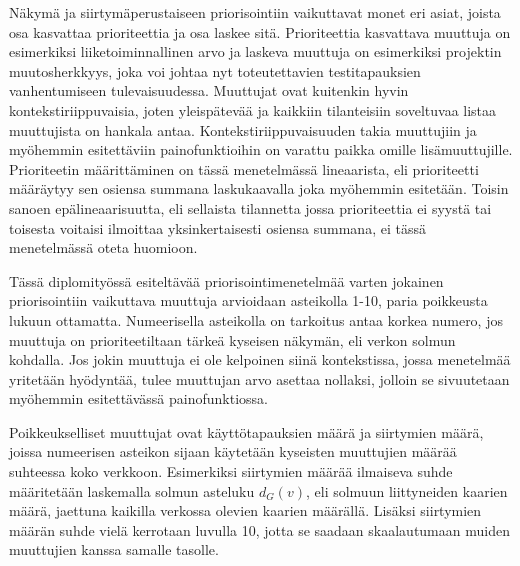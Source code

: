   Näkymä ja siirtymäperustaiseen priorisointiin vaikuttavat monet eri asiat, joista osa kasvattaa prioriteettia ja osa laskee sitä.
  Prioriteettia kasvattava muuttuja on esimerkiksi liiketoiminnallinen arvo ja laskeva muuttuja on esimerkiksi projektin muutosherkkyys, joka voi johtaa nyt toteutettavien testitapauksien vanhentumiseen tulevaisuudessa.
  Muuttujat ovat kuitenkin hyvin kontekstiriippuvaisia, joten yleispätevää ja kaikkiin tilanteisiin soveltuvaa listaa muuttujista on hankala antaa.
  Kontekstiriippuvaisuuden takia muuttujiin ja myöhemmin esitettäviin painofunktioihin on varattu paikka omille lisämuuttujille.
  Prioriteetin määrittäminen on tässä menetelmässä lineaarista, eli prioriteetti määräytyy sen osiensa summana laskukaavalla joka myöhemmin esitetään.
  Toisin sanoen epälineaarisuutta, eli sellaista tilannetta jossa prioriteettia ei syystä tai toisesta voitaisi ilmoittaa yksinkertaisesti osiensa summana, ei tässä menetelmässä oteta huomioon.

  Tässä diplomityössä esiteltävää priorisointimenetelmää varten jokainen priorisointiin vaikuttava muuttuja arvioidaan asteikolla 1-10, paria poikkeusta lukuun ottamatta.
  Numeerisella asteikolla on tarkoitus antaa korkea numero, jos muuttuja on prioriteetiltaan tärkeä kyseisen näkymän, eli verkon solmun kohdalla.
  Jos jokin muuttuja ei ole kelpoinen siinä kontekstissa, jossa menetelmää yritetään hyödyntää, tulee muuttujan arvo asettaa nollaksi, jolloin se sivuutetaan myöhemmin esitettävässä painofunktiossa.

  Poikkeukselliset muuttujat ovat käyttötapauksien määrä ja siirtymien määrä, joissa numeerisen asteikon sijaan käytetään kyseisten muuttujien määrää suhteessa koko verkkoon.
  Esimerkiksi siirtymien määrää ilmaiseva suhde määritetään laskemalla solmun asteluku \(d_G(v)\), eli solmuun liittyneiden kaarien määrä, jaettuna kaikilla verkossa olevien kaarien määrällä.
  Lisäksi siirtymien määrän suhde vielä kerrotaan luvulla 10, jotta se saadaan skaalautumaan muiden muuttujien kanssa samalle tasolle.

